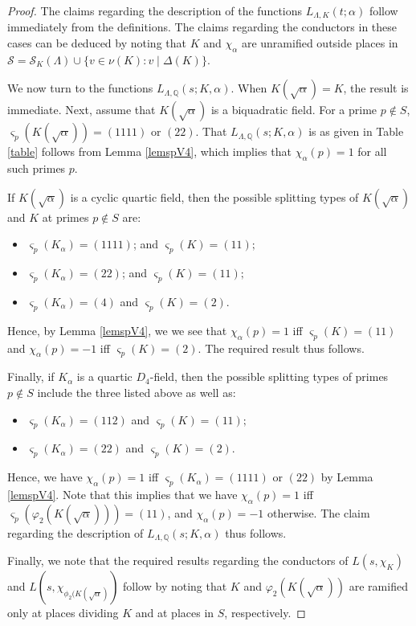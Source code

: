 \documentclass[10pt]{article}
\theoremstyle{plain}
\theoremstyle{definition}
\theoremstyle{remark}
\def\val{{\nu}}
\def\Q{{\mathbb Q}}
\def\Q{{\mathbb Q}}
\def\cS{{\mathcal S}}
\begin{document}
\begin{proof}
The claims regarding the description of the functions
$L_{\Lambda,K}(t;\alpha)$ follow immediately from the definitions. The
claims regarding the conductors in these cases can be deduced by noting
that $K$ and $\chi_\alpha$ are unramified outside places in $\cS= \cS_K(\Lambda) \cup \{v \in \val(K) : v\mid\Delta(K)\}$.

\medskip

We now turn to the functions $L_{\Lambda,\Q}(s;K,\alpha)$. When
$K(\sqrt{\alpha})=K$, the result is immediate. Next, assume that
$K(\sqrt{\alpha})$ is a biquadratic field. For a prime $p \notin S$,
$\varsigma_p(K(\sqrt{\alpha})) = (1111)$ or $(22)$. That
$L_{\Lambda,\Q}(s;K,\alpha)$ is as given in Table \ref{table} follows
from Lemma \ref{lemspV4}, which implies that $\chi_\alpha(p)=1$ for
all such primes $p$.

If $K(\sqrt{\alpha})$ is a cyclic quartic field, then the possible
splitting types of $K(\sqrt{\alpha})$ and $K$ at primes $p \notin S$
are:
\begin{itemize}
\item[{\rm (a)}] $\varsigma_p(K_\alpha) = (1111)$;
  and $\varsigma_p(K) = (11);$%
\item[{\rm (b)}] $\varsigma_p(K_\alpha) = (22)$;
  and $\varsigma_p(K) = (11);$%
\item[{\rm (c)}] $\varsigma_p(K_\alpha) = (4)$ and $\varsigma_p(K) = (2)$. 
\end{itemize}
Hence, by Lemma \ref{lemspV4}, we we see that $\chi_\alpha(p)=1$ iff
$\varsigma_p(K) = (11)$ and $\chi_\alpha(p)=-1$ iff
$\varsigma_p(K)=(2)$. The required result thus follows.

Finally, if $K_\alpha$ is a quartic $D_4$-field, then the possible
splitting types of primes $p \notin S$ include the three listed above
as well as:
\begin{itemize}
\item[{\rm (d)}] $\varsigma_p(K_\alpha) = (112)$
  and $\varsigma_p(K) = (11);$%
\item[{\rm (e)}] $\varsigma_p(K_\alpha) = (22)$ and $\varsigma_p(K) =
  (2)$.
\end{itemize}
Hence, we have $\chi_\alpha(p)=1$ iff $\varsigma_p(K_\alpha) = (1111)$ or
$(22)$ by Lemma \ref{lemspV4}. Note that this implies that we have
$\chi_\alpha(p) = 1$ iff $\varsigma_p(\varphi_2(K(\sqrt{\alpha}))) =
(11)$, and $\chi_\alpha(p)=-1$ otherwise. The claim regarding 
the description of $L_{\Lambda,\Q}(s;K,\alpha)$ thus follows.

Finally, we note that the required results regarding the conductors of
$L(s,\chi_K)$ and $L(s,\chi_{\phi_2(K(\sqrt{\alpha})})$
follow by noting that $K$ and $\varphi_2(K(\sqrt{\alpha}))$ are ramified only
at places dividing $K$ and at places in $S$, respectively.
\end{proof}
\end{document}
